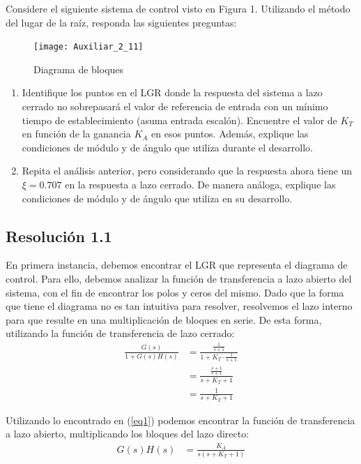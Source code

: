 \documentclass[
  11pt,
  letterpaper,
   addpoints,
   answers
  ]{exam}
\begin{document}
\begin{questions}
    \question Considere el siguiente sistema de control visto en Figura 1. Utilizando el método del lugar de la raíz, responda las siguientes preguntas:
    \begin{figure}[h]
        \centering
        \texttt{[image: Auxiliar\_2\_11]}
        \caption{Diagrama de bloques}
    \end{figure}
    \begin{enumerate}
        \item Identifique los puntos en el LGR donde la respuesta del sistema a lazo cerrado no sobrepasará el valor de referencia de entrada con un mínimo tiempo de establecimiento (asuma entrada escalón). Encuentre el valor de \(K_T\) en función de la ganancia \(K_A\) en esos puntos. Además, explique las condiciones de módulo y de ángulo que utiliza durante el desarrollo.
        \item Repita el análisis anterior, pero considerando que la respuesta ahora tiene un \(\xi=0.707\) en la respuesta a lazo cerrado. De manera análoga, explique las condiciones de módulo y de ángulo que utiliza en su desarrollo.
    \end{enumerate}
\begin{solution}
    \subsection*{Resolución 1.1}
    En primera instancia, debemos encontrar el LGR que representa el diagrama de control. Para ello, debemos analizar la función de transferencia a lazo abierto del sistema, con el fin de encontrar los polos y ceros del mismo. Dado que la forma que tiene el diagrama no es tan intuitiva para resolver, resolvemos el lazo interno para que resulte en una multiplicación de bloques en serie. De esta forma, utilizando la función de transferencia de lazo cerrado:
    \begin{align}
        \frac{G(s)}{1+G(s)H(s)} &= \frac{\frac{1}{s+1}}{1+K_T \cdot \frac{1}{s+1}} \nonumber\\
        &= \frac{\frac{s+1}{s+1}}{s+K_T +1} \nonumber \\
        &= \frac{1}{s+K_T+1} \label{eq1}
    \end{align}
    
    Utilizando lo encontrado en (\ref{eq1}) podemos encontrar la función de transferencia a lazo abierto, multiplicando los bloques del lazo directo:
    \begin{align}
        G(s)H(s) &= \frac{K_A}{s(s+K_T+1)} \label{eq2}
    \end{align}
    

\end{solution}
\end{questions}
\end{document}
